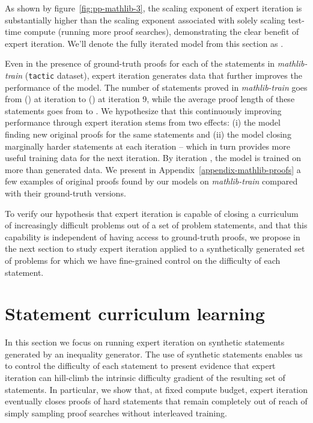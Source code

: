 \documentclass[nohyperref]{article}
\theoremstyle{plain}
\theoremstyle{definition}
\theoremstyle{remark}
\begin{document}
As shown by figure~\ref{fig:pp-mathlib-3}, the scaling exponent of expert iteration is substantially higher than the scaling exponent associated with solely scaling test-time compute (running more proof searches), demonstrating the clear benefit of expert iteration. We'll denote the fully iterated model from this section as .

Even in the presence of ground-truth proofs for each of the statements in \textit{mathlib-train} (\texttt{tactic} dataset), expert iteration generates data that further improves the performance of the model. The number of statements proved in \textit{mathlib-train} goes from  () at iteration  to  () at iteration 9, while the average proof length of these statements goes from  to . We hypothesize that this continuously improving performance through expert iteration stems from two effects: (i) the model finding new original proofs for the same statements and (ii) the model closing marginally harder statements at each iteration -- which in turn provides more useful training data for the next iteration. By iteration , the model is trained on more than  generated data. We present in Appendix~\ref{appendix-mathlib-proofs} a few examples of original proofs found by our models on \textit{mathlib-train} compared with their ground-truth versions. 

To verify our hypothesis that expert iteration is capable of closing a curriculum of increasingly difficult problems out of a set of problem statements, and that this capability is independent of having access to ground-truth proofs, we propose in the next section to study expert iteration applied to a synthetically generated set of problems for which we have fine-grained control on the difficulty of each statement.

\section{Statement curriculum learning}
\label{climbing}

In this section we focus on running expert iteration on synthetic statements generated by an inequality generator. The use of synthetic statements enables us to control the difficulty of each statement to present evidence that expert iteration can hill-climb the intrinsic difficulty gradient of the resulting set of statements. In particular, we show that, at fixed compute budget, expert iteration eventually closes proofs of hard statements that remain completely out of reach of simply sampling proof searches without interleaved training.
\end{document}
